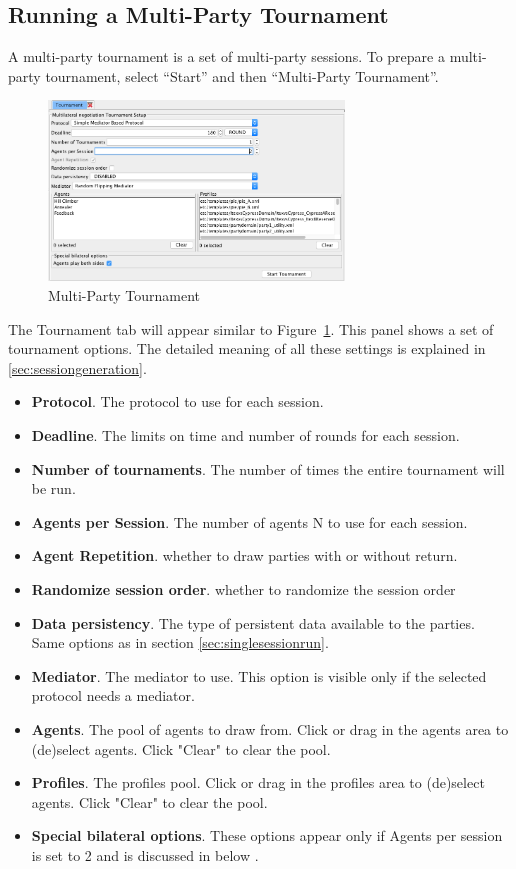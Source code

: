 \documentclass[]{article}
\begin{document}
\subsection{Running a Multi-Party Tournament}
A multi-party tournament is a set of multi-party sessions. To prepare a multi-party tournament, select  ``Start'' and then ``Multi-Party Tournament''. 

\begin{figure}[htb]
	\centering
	\includegraphics[width=0.7\textwidth]{media/multipartytournament.png}
\caption{Multi-Party Tournament}\label{Fig:multipartytournament}
\end{figure}

The Tournament tab will appear similar to Figure~\ref{Fig:multipartytournament}. This panel shows a set of tournament options. The detailed meaning of all these settings is explained in \ref{sec:sessiongeneration}.

\begin{itemize}
	\item \textbf{Protocol}. The protocol to use for each session.
	\item \textbf{Deadline}. The limits on time and number of rounds for each session.
	\item \textbf{Number of tournaments}. The number of times the entire tournament will be run.
	\item \textbf{Agents per Session}. The number of agents N to use for each session.
	\item \textbf{Agent Repetition}. whether to draw parties with or without return.
	\item \textbf{Randomize session order}. whether to randomize the session order
	\item \textbf{Data persistency}. The type of persistent data available to the parties. Same options as in section \ref{sec:singlesessionrun}.
	\item \textbf{Mediator}. The mediator to use. This option is visible only if the selected protocol needs a mediator. 
	\item \textbf{Agents}. The pool of agents to draw from. Click or drag in the agents area to (de)select agents. Click "Clear" to clear the pool.
	\item \textbf{Profiles}. The profiles pool. Click or drag in the profiles area to (de)select agents. Click "Clear" to clear the pool.
	\item \textbf{Special bilateral options}. These options appear only if Agents per session is set to 2 and is discussed in below .
\end{itemize}
\end{document}
